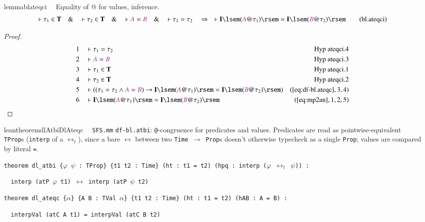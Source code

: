 \begin{restatable}{lemma}{blateqci}~~ Equality of @ for values, inference.
\begin{align}
\vdash \tau_1 \in \mathbf{T}\quad\&\quad \vdash \tau_2 \in
    \mathbf{T}\quad\&\quad \vdash \mc{A} = \mc{B}\quad\&\quad \vdash \tau_1 =
    \tau_2\quad\Rightarrow\quad \vdash \mathbf{I} \lsem ( \mc{A} @ \tau_1 )
    \rsem = \mathbf{I} \lsem ( \mc{B} @ \tau_2 )
    \rsem\label{eq:bl.ateqci}\tag{bl.ateqci}
\end{align}
\end{restatable}

\begin{proof}
\begin{align}
  1 &&  & \vdash \tau_1 = \tau_2&\text{Hyp~ateqci.4}\notag%
  \\ 2 &&  & \vdash \mc{A} = \mc{B}&\text{Hyp~ateqci.3}\notag%
  \\ 3 &&  & \vdash \tau_1 \in \mathbf{T}&\text{Hyp~ateqci.1}\notag%
  \\ 4 &&  & \vdash \tau_2 \in \mathbf{T}&\text{Hyp~ateqci.2}\notag%
  \\ 5 &&  & \vdash ( ( \tau_1 = \tau_2 \wedge \mc{A} = \mc{B} ) \rightarrow
      \mathbf{I} \lsem ( \mc{A} @ \tau_1 ) \rsem =
      \mathbf{I} \lsem ( \mc{B} @ \tau_2 ) \rsem
      )&(\mbox{\ref{eq:df-bl.ateqc}},3,4)\notag
  \\ 6 &&  & \vdash \mathbf{I} \lsem ( \mc{A} @ \tau_1 ) \rsem = \mathbf{I}
      \lsem ( \mc{B} @ \tau_2 )
      \rsem&(\mbox{\ref{eq:mp2an}},1,2,5)\notag
\end{align}
\end{proof}

\begin{restatable}{leantheorem}{dlAtbiDlAteqc}~~ \texttt{SFS.mm} \texttt{df-bl.atbi}: \texttt{@}-congruence for predicates and values. Predicates are read as pointwise-equivalent \texttt{TProp}s (\texttt{interp} of a $\leftrightarrow_t$), since a bare $\leftrightarrow$ between two \texttt{Time $\to$ Prop}s doesn't otherwise typecheck as a single \texttt{Prop}; values are compared by literal \texttt{=}.

\texttt{\textcolor{leancolor}{theorem} \textcolor{leanyellow}{dl\_atbi} \{$\varphi$ $\psi$ : TProp\} \{t1 t2 : Time\} (ht : t1 = t2) (hpq : interp ($\varphi$ $\leftrightarrow_t$ $\psi$)) :}

\texttt{~~interp (atP $\varphi$ t1) $\leftrightarrow$ interp (atP $\psi$ t2)}

\texttt{\textcolor{leancolor}{theorem} \textcolor{leanyellow}{dl\_ateqc} \{$\alpha$\} \{A B : TVal $\alpha$\} \{t1 t2 : Time\} (ht : t1 = t2) (hAB : A = B) :}

\texttt{~~interpVal (atC A t1) = interpVal (atC B t2)}
\label{dl_atbi}
\label{dl_ateqc}
\end{restatable}

